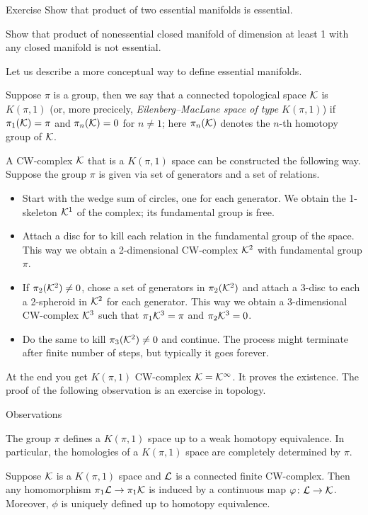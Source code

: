 \begin{thm}{Exercise}\label{ex:product-essential}
Show that product of two essential manifolds is essential.

Show that product of nonessential closed manifold of dimension at least 1 with any closed manifold is not essential.
\end{thm}

Let us describe a more conceptual way to define essential manifolds.

Suppose $\pi$ is a group,
then we say that a connected topological space $\mathcal{K}$ is \emph{$K(\pi,1)$} (or, more precicely, \emph{Eilenberg--MacLane space of type $K(\pi,1)$})
if $\pi_1(\mathcal{K})=\pi$ and $\pi_n(\mathcal{K})=0$ for $n\ne 1$;
here $\pi_n(\mathcal{K})$ denotes the $n$-th homotopy group of $\mathcal{K}$.

A CW-complex $\mathcal{K}$ that is a $K(\pi,1)$ space can be constructed the following way.
Suppose the group $\pi$ is given via set of generators and a set of relations. 
\begin{itemize}
\item Start with the wedge sum of circles, one for each generator.
We obtain the 1-skeleton $\mathcal{K}^1$ of the complex; its fundamental group is free.

\item Attach a disc for to kill each relation in the fundamental group of the space.
This way we obtain a 2-dimensional CW-complex $\mathcal{K}^2$ with fundamental group $\pi$.

\item If $\pi_2(\mathcal{K}^2)\ne0$, chose a set of generators in $\pi_2(\mathcal{K}^2)$ and attach a $3$-disc to each a 2-spheroid in $\mathcal{K}^2$ for each generator.
This way we obtain a 3-dimensional CW-complex $\mathcal{K}^3$ such that  $\pi_1\mathcal{K}^3=\pi$ and $\pi_2\mathcal{K}^3=0$.


\item Do the same to kill $\pi_3(\mathcal{K}^2)\ne0$ and continue.
The process might terminate after finite number of steps, but typically it goes forever.
\end{itemize}
At the end you get $K(\pi,1)$ CW-complex  $\mathcal{K}=\mathcal{K}^\infty$.
It proves the existence.
The proof of the following observation is an exercise in topology.

\begin{thm}{Observations}

\begin{subthm}{}
The group $\pi$ defines a $K(\pi,1)$ space up to a weak homotopy equivalence.
In particular, the homologies of a $K(\pi,1)$ space are completely determined by $\pi$.
\end{subthm}


\begin{subthm}{}
Suppose $\mathcal{K}$ is a $K(\pi,1)$ space and $\mathcal{L}$ is a connected finite CW-complex.
Then any homomorphism $\pi_1\mathcal{L}\to\pi_1\mathcal{K}$ is induced by a continuous map $\varphi\colon\mathcal{L}\to\mathcal{K}$.
Moreover, $\phi$ is uniquely defined up to homotopy equivalence.
\end{subthm}

\end{thm}

